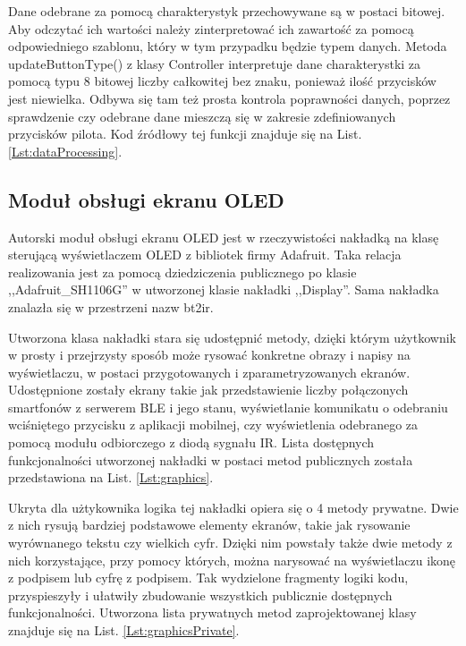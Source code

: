 \documentclass[12pt,twoside]{article}
\begin{document}


Dane odebrane za pomocą charakterystyk przechowywane są w postaci bitowej. Aby odczytać ich wartości należy zinterpretować ich zawartość za pomocą odpowiedniego szablonu, który w tym przypadku będzie typem danych. Metoda updateButtonType() z klasy Controller interpretuje dane charakterystki za pomocą typu 8 bitowej liczby całkowitej bez znaku, ponieważ ilość przycisków jest niewielka. Odbywa się tam też prosta kontrola poprawności danych, poprzez sprawdzenie czy odebrane dane mieszczą się w zakresie zdefiniowanych przycisków pilota. Kod źródłowy tej funkcji znajduje się na List. \ref*{Lst:dataProcessing}.



\subsection{Moduł obsługi ekranu OLED}
Autorski moduł obsługi ekranu OLED jest w rzeczywistości nakładką na klasę sterującą wyświetlaczem OLED z bibliotek firmy Adafruit. Taka relacja realizowania jest za pomocą dziedziczenia publicznego po klasie ,,Adafruit\_SH1106G'' w utworzonej klasie nakładki ,,Display''. Sama nakładka znalazła się w przestrzeni nazw bt2ir.

Utworzona klasa nakładki stara się udostępnić metody, dzięki którym użytkownik w prosty i przejrzysty sposób może rysować konkretne obrazy i napisy na wyświetlaczu, w postaci przygotowanych i zparametryzowanych ekranów. Udostępnione zostały ekrany takie jak przedstawienie liczby połączonych smartfonów z serwerem BLE i jego stanu, wyświetlanie komunikatu o odebraniu wciśniętego przycisku z aplikacji mobilnej, czy wyświetlenia odebranego za pomocą modułu odbiorczego z diodą sygnału IR. Lista dostępnych funkcjonalności utworzonej nakładki w postaci metod publicznych została przedstawiona na List. \ref*{Lst:graphics}.



Ukryta dla użtykownika logika tej nakładki opiera się o 4 metody prywatne. Dwie z nich rysują bardziej podstawowe elementy ekranów, takie jak rysowanie wyrównanego tekstu czy wielkich cyfr. Dzięki nim powstały także dwie metody z nich korzystające, przy pomocy których, można narysować na wyświetlaczu ikonę z podpisem lub cyfrę z podpisem. Tak wydzielone fragmenty logiki kodu, przyspieszyły i ułatwiły zbudowanie wszystkich publicznie dostępnych funkcjonalności. Utworzona lista prywatnych metod zaprojektowanej klasy znajduje się na List. \ref*{Lst:graphicsPrivate}.
\end{document}
